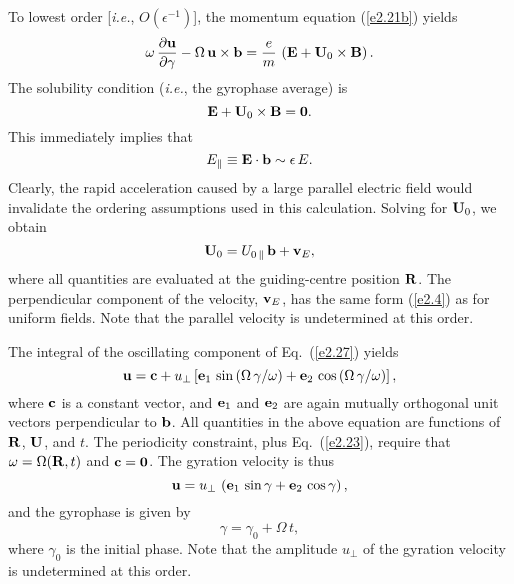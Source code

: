 To lowest order [{\em i.e.}, $O(\epsilon^{-1})$], the momentum equation
(\ref{e2.21b}) yields
\begin{equation}\label{e2.27}
\omega\,\frac{\partial{\bf u}}{\partial\gamma} - {\Omega}\,{\bf u}\times{\bf 
b} = \frac{e}{m}\,\left({\bf E} + {\bf U}_0\times{\bf B}\right).
\end{equation}
The solubility condition ({\em i.e.}, the gyrophase average) is
\begin{equation}
{\bf E} + {\bf U}_0\times {\bf B} = {\bf 0}.
\end{equation}
This immediately implies that
\begin{equation}
E_\parallel \equiv {\bf E}\cdot {\bf b} \sim \epsilon\,E.
\end{equation}
Clearly, the rapid acceleration caused by a large parallel electric
field would invalidate the ordering assumptions used in this calculation. 
Solving for ${\bf U}_0$, we obtain
\begin{equation}\label{e2.30}
{\bf U}_0 = U_{0\,\parallel} \,{\bf b} + {\bf v}_E,
\end{equation}
where all quantities are evaluated at the guiding-centre position ${\bf R}$. The
perpendicular component of the velocity, ${\bf v}_E$, has the
same form (\ref{e2.4}) as for uniform fields. Note that the parallel velocity is
undetermined at this order.

The integral of the oscillating component of Eq.~(\ref{e2.27}) yields
\begin{equation}
{\bf u} = {\bf c} + u_\perp \left[ {\bf e}_1\,\sin \,({\Omega}\,\gamma/\omega)
+{\bf e}_2\,\cos\,({\Omega}\,\gamma/\omega)\right],
\end{equation}
where ${\bf c}$ is a constant vector, and ${\bf e}_1$ and ${\bf e}_2$ are again
mutually
orthogonal unit vectors perpendicular to ${\bf b}$. All quantities in the
above equation are functions of ${\bf R}$, ${\bf U}$, and $t$. 
 The periodicity
constraint, plus Eq.~(\ref{e2.23}), require that $\omega={\Omega}({\bf R}, t)$
and ${\bf c} = {\bf 0}$. The gyration velocity is thus
\begin{equation}
{\bf u} = u_\perp \,\left({\bf e}_1\,\sin\gamma + {\bf e}_2\,\cos\gamma\right),
\end{equation}
and the gyrophase is given by
\begin{equation}\label{e2.33}
\gamma = \gamma_0 + {\Omega}\,t,
\end{equation}
where $\gamma_0$ is the initial phase. Note that the amplitude $u_\perp$
of the gyration velocity is undetermined at this order.

